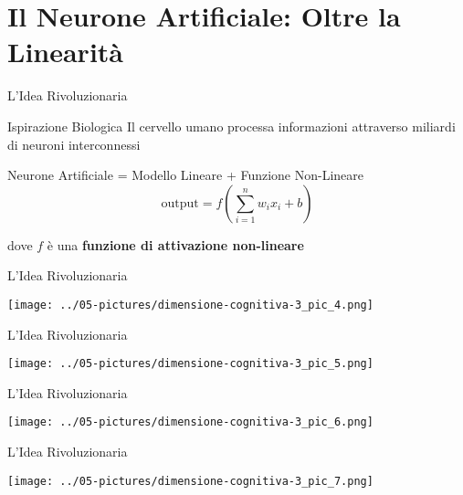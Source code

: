 \documentclass[aspectratio=169]{beamer}
\begin{document}
\section{Il Neurone Artificiale: Oltre la Linearità}
%
%
\begin{frame}{L'Idea Rivoluzionaria}

\begin{block}{Ispirazione Biologica}
Il cervello umano processa informazioni attraverso miliardi di neuroni interconnessi
\end{block}

\begin{block}{Neurone Artificiale = Modello Lineare + Funzione Non-Lineare}
$$\text{output} = f\left(\sum_{i=1}^{n} w_i x_i + b\right)$$

dove $f$ è una \textbf{funzione di attivazione non-lineare}
\end{block}

\end{frame}
%
%
\begin{frame}{L'Idea Rivoluzionaria}
\begin{center}
\texttt{[image: ../05-pictures/dimensione-cognitiva-3\_pic\_4.png]} 
\end{center}
\end{frame}
%
%
\begin{frame}{L'Idea Rivoluzionaria}
\begin{center}
\texttt{[image: ../05-pictures/dimensione-cognitiva-3\_pic\_5.png]} 
\end{center}
\end{frame}
%
%
\begin{frame}{L'Idea Rivoluzionaria}
\begin{center}
\texttt{[image: ../05-pictures/dimensione-cognitiva-3\_pic\_6.png]} 
\end{center}
\end{frame}
%
%
\begin{frame}{L'Idea Rivoluzionaria}
\begin{center}
\texttt{[image: ../05-pictures/dimensione-cognitiva-3\_pic\_7.png]} 
\end{center}
\end{frame}
\end{document}
